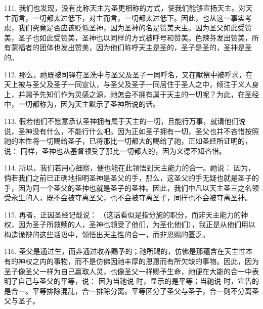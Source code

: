 111. 我们也发现，没有比称天主为圣更相称的方式，使我们能够宣扬天主。对天主而言，一切都太过低下，对主而言，一切都太过低下。因此，也从这一事实考虑，我们究竟是否应该贬低圣神，因为圣神的名是赞美天主。因为圣父如此受赞美，圣子也如此受赞美，圣神也以同样的方式被呼号和赞美。色辣芬发出赞美，所有蒙福者的团体也发出赞美，因为他们称呼天主是圣的，圣子是圣的，圣神是圣的。\par

112. 那么，祂既被司铎在圣洗中与圣父及圣子一同呼名，又在献祭中被呼求，在天上被与圣父及圣子一同宣认，与圣父及圣子一同居住于圣人之中，倾注于义人身上，并赐予先知们作为灵感之源，祂怎会不拥有属于天主的一切呢？为此，在圣经中，一切都称为，因为天主默示了圣神所说的话。\par

113. 假若他们不愿意承认圣神拥有属于天主的一切，且能行万事，就请他们说说，圣神没有什么，不能行什么吧。因为正如圣子拥有一切，圣父也并不吝惜按照祂的本性将一切赐给圣子，已将那比一切都大的赐给了祂，正如圣经所证明的，说： 同样，圣神也从基督领受了那比一切都大的，因为义德不知吝惜。\par

114. 所以，我们若用心细察，便也能在此领悟到天主能力的合一。祂说： 因为，倘若我们之前已正确地指明圣神是圣父的手，那么，这圣父的手无疑也就是圣子的手，因为同一个圣父的圣神也就是圣子的圣神。因此，我们中凡以天主圣三之名领受永生的人，既不会被夺离圣父，也不会被夺离圣子，同样也不会被夺离圣神。\par

115. 再者，正因圣经记载说： （这话看似是指分施的职分，而非天主能力的神权，因为圣子所救赎的人，圣神也领受了他们，为圣化他们），我正是从他们用以构造诡辩的这些话语中，领悟出天主性的合一，而非恩赐的匮乏。\par

116. 圣父是通过生，而非通过收养赐予的；祂所赐的，仿佛是那蕴含在天主性本有的神权之内的事物，而不是仿佛因祂丰厚的恩惠而有所欠缺的事物。因此，因为圣子像圣父一样为自己赢取人灵，也像圣父一样赐予生命，祂便在大能的合一中表明了自己与圣父的平等，说： 因为当祂说  时，显示的是平等；当祂说  时，宣告的是合一。平等排除混乱，合一排除分离。平等区分了圣父与圣子，合一则不分离圣父与圣子。\par

